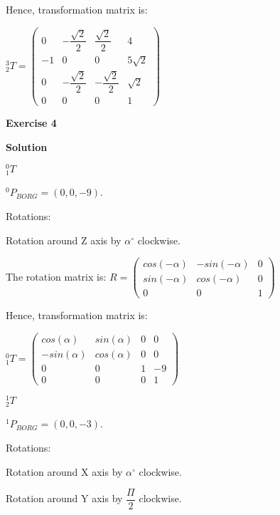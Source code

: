 \documentclass[12pt]{article}
\begin{document}
Hence, transformation matrix is:

$_{2}^{3}T = \left(\begin{array}{cccc}
0 & -\dfrac{\sqrt{2}}{2} & \dfrac{\sqrt{2}}{2} & 4 \\
-1 & 0 & 0 & 5\sqrt{2}\\
0 & -\dfrac{\sqrt{2}}{2} & -\dfrac{\sqrt{2}}{2} & \sqrt{2}\\
0 & 0 & 0 & 1\end{array}\right)$

\newpage

\textbf{Exercise 4}		
		
\textbf{Solution}

\begin{list}{)~}{}
\item
$_{1}^{0}T$

$^0 P_{BORG} = \left(0, 0, -9\right)$.

Rotations:

\begin{list}{)~}{}
\item
Rotation around Z axis by $\alpha^\circ$ clockwise.
\end{list}

The rotation matrix is:
$R=\left(\begin{array}{ccc}
cos\left(-\alpha\right) & -sin\left(-\alpha\right) & 0 \\
sin\left(-\alpha\right) & cos\left(-\alpha\right) & 0\\
0 & 0 & 1\end{array}\right)$

Hence, transformation matrix is:

$_{1}^{0}T = \left(\begin{array}{cccc}
cos\left(\alpha\right) & sin\left(\alpha\right) & 0 & 0 \\
-sin\left(\alpha\right) & cos\left(\alpha\right) & 0 & 0\\
0 & 0 & 1 & -9\\
0 & 0 & 0 & 1\end{array}\right)$

\item
$_{2}^{1}T$

$^1 P_{BORG} = \left(0, 0, -3\right)$.

Rotations:

\begin{list}{)~}{}
\item Rotation around X axis by $\alpha^\circ$ clockwise.
\item Rotation around Y axis by $\dfrac{\Pi}{2}$ clockwise.
\end{list}


\end{list}
\end{document}
